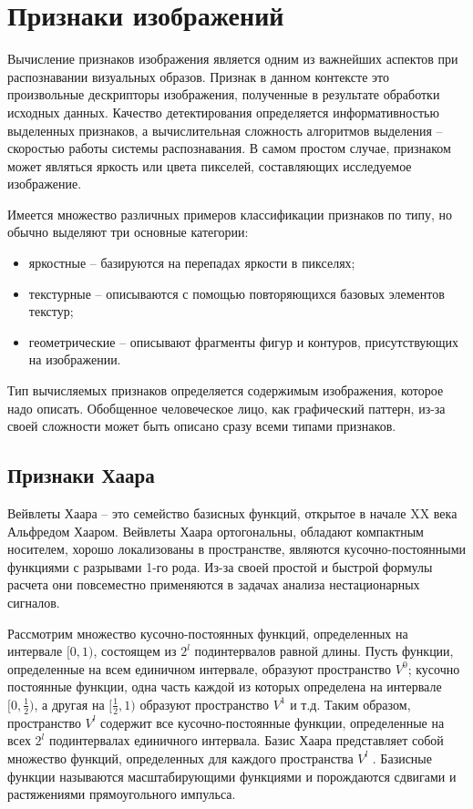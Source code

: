 \newpage
\section{Признаки изображений}

Вычисление признаков изображения является одним из важнейших аспектов при распознавании визуальных образов. Признак в данном контексте это произвольные дескрипторы изображения, полученные в результате обработки исходных данных. Качество детектирования определяется информативностью выделенных признаков, а вычислительная сложность алгоритмов выделения -- скоростью работы системы распознавания. В самом простом случае, признаком может являться яркость или цвета пикселей, составляющих исследуемое изображение.

Имеется множество различных примеров классификации признаков по типу, но обычно выделяют три основные категории:
\begin{itemize}
\item яркостные -- базируются на перепадах яркости в пикселях;
\item текстурные -- описываются с помощью повторяющихся базовых элементов текстур;
\item геометрические -- описывают фрагменты фигур и контуров, присутствующих на изображении.
\end{itemize}

Тип вычисляемых признаков определяется содержимым изображения, которое надо описать. Обобщенное человеческое лицо, как графический паттерн, из-за своей сложности может быть описано сразу всеми типами признаков. 

\subsection{Признаки Хаара}

Вейвлеты Хаара -- это семейство базисных функций, открытое в начале XX века Альфредом Хааром. Вейвлеты Хаара ортогональны, обладают компактным носителем, хорошо локализованы в пространстве, являются кусочно-постоянными функциями с разрывами 1-го рода. Из-за своей простой и быстрой формулы расчета они повсеместно применяются в задачах анализа нестационарных сигналов.


Рассмотрим множество кусочно-постоянных функций, определенных на интервале $[0, 1)$, состоящем из $2^l$ подинтервалов равной длины. Пусть функции, определенные на всем единичном интервале, образуют пространство $V^0$; кусочно постоянные функции, одна часть каждой из которых определена на интервале $[0, \frac{1}{2})$, а другая на $[\frac{1}{2}, 1)$ образуют пространство $V^1$ и т.д. Таким образом, пространство $V^l$ содержит все кусочно-постоянные функции, определенные на всех $2^l$ подинтервалах единичного интервала. Базис Хаара представляет собой множество функций, определенных для каждого пространства $V^l$ . Базисные функции называются масштабирующими функциями и порождаются сдвигами и растяжениями прямоугольного импульса.

